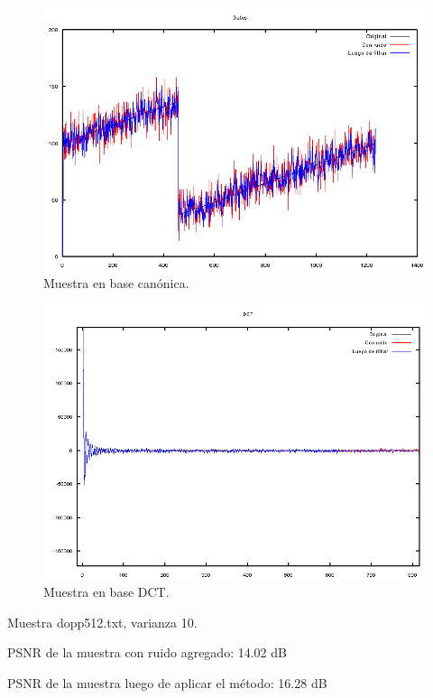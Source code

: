 \documentclass[a4paper,10pt,twoside]{article}
\begin{document}
\begin{figure}[H]
  \centering
  \includegraphics[width=15cm]{graficos/ramp_aditivo_atenuar_muestra.png}
  \caption{Muestra en base canónica.}
\end{figure}

\begin{figure}[H]
  \centering
  \includegraphics[width=15cm]{graficos/ramp_aditivo_atenuar_dct.png} 
  \caption{Muestra en base DCT.}
\end{figure}


Muestra dopp512.txt, varianza 10.

PSNR de la muestra con ruido agregado: 14.02 dB

PSNR de la muestra luego de aplicar el método: 16.28 dB
\end{document}
